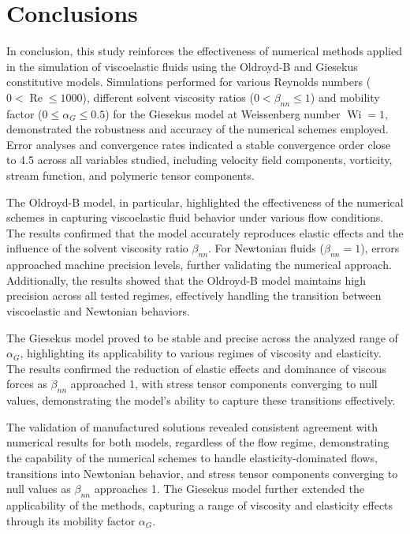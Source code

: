 \documentclass[preprint, 12pt]{elsarticle}
\begin{document}
\section{Conclusions}\label{sec_Conclusions}

In conclusion, this study reinforces the effectiveness of numerical methods applied in the simulation of viscoelastic fluids using the Oldroyd-B and Giesekus constitutive models. Simulations performed for various Reynolds numbers ($0<\operatorname{Re}\leq 1000$), different solvent viscosity ratios ($0<\beta_{nn}\leq 1$) and mobility factor ($0\leq\alpha_G\leq 0.5$) for the Giesekus model at Weissenberg number $\operatorname{Wi}=1$, demonstrated the robustness and accuracy of the numerical schemes employed. Error analyses and convergence rates indicated a stable convergence order close to 4.5 across all variables studied, including velocity field components, vorticity, stream function, and polymeric tensor components.

The Oldroyd-B model, in particular, highlighted the effectiveness of the numerical schemes in capturing viscoelastic fluid behavior under various flow conditions. The results confirmed that the model accurately reproduces elastic effects and the influence of the solvent viscosity ratio $\beta_{nn}$. For Newtonian fluids ($\beta_{nn}=1$), errors approached machine precision levels, further validating the numerical approach. Additionally, the results showed that the Oldroyd-B model maintains high precision across all tested regimes, effectively handling the transition between viscoelastic and Newtonian behaviors.

The Giesekus model proved to be stable and precise across the analyzed range of $\alpha_G$, highlighting its applicability to various regimes of viscosity and elasticity. The results confirmed the reduction of elastic effects and dominance of viscous forces as $\beta_{nn}$ approached 1, with stress tensor components converging to null values, demonstrating the model’s ability to capture these transitions effectively.

The validation of manufactured solutions revealed consistent agreement with numerical results for both models, regardless of the flow regime, demonstrating the capability of the numerical schemes to handle elasticity-dominated flows, transitions into Newtonian behavior, and stress tensor components converging to null values as $\beta_{nn}$ approaches 1. The Giesekus model further extended the applicability of the methods, capturing a range of viscosity and elasticity effects through its mobility factor $\alpha_G$.
\end{document}
